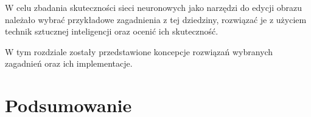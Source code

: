 \documentclass[10pt, a4paper, twoside]{article}
\begin{document}
  W celu zbadania skuteczności sieci neuronowych jako narzędzi do edycji obrazu
  należało wybrać przykładowe zagadnienia z tej dziedziny, rozwiązać je z
  użyciem technik sztucznej inteligencji oraz ocenić ich skuteczność.

  W tym rozdziale zostały przedstawione koncepcje rozwiązań wybranych zagadnień
  oraz ich implementacje.

  

\section{Podsumowanie}




\end{document}
